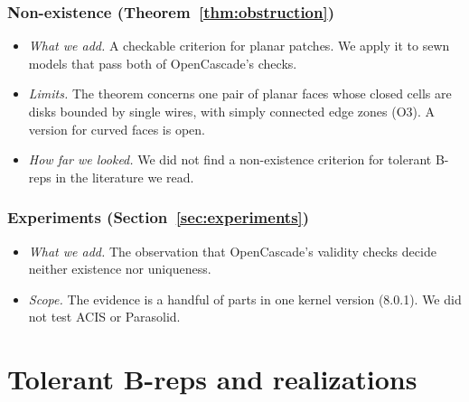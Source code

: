 \documentclass[preprint,12pt]{elsarticle}
\theoremstyle{definition}
\theoremstyle{remark}
\begin{document}
\subsubsection*{Non-existence (Theorem~\ref{thm:obstruction})}
\begin{itemize}
\item \emph{What we add.} A checkable criterion for planar patches. We apply it to sewn models that pass both of
OpenCascade's checks.
\item \emph{Limits.} The theorem concerns one pair of planar faces whose closed cells are disks bounded by single wires,
with simply connected edge zones (O3). A version for curved faces is open.
\item \emph{How far we looked.} We did not find a non-existence criterion for tolerant B-reps in the literature we
read.
\end{itemize}

\subsubsection*{Experiments (Section~\ref{sec:experiments})}
\begin{itemize}
\item \emph{What we add.} The observation that OpenCascade's validity checks decide neither existence nor uniqueness.
\item \emph{Scope.} The evidence is a handful of parts in one kernel version (8.0.1). We did not test ACIS or
Parasolid.
\end{itemize}

\section{Tolerant B-reps and realizations}\label{sec:setting}
\end{document}
